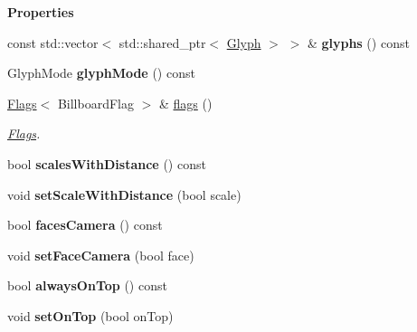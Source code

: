 \begin{Indent}\textbf{ Properties}\par
\begin{DoxyCompactItemize}
\item 
\mbox{\label{classrev_1_1_canvas_component_a3d3c700a258d2e3571b28fca33c7b177}} 
const std\+::vector$<$ std\+::shared\+\_\+ptr$<$ \mbox{\hyperlink{classrev_1_1_glyph}{Glyph}} $>$ $>$ \& {\bfseries glyphs} () const
\item 
\mbox{\label{classrev_1_1_canvas_component_a71690bbf5d7a7fa2faaecf50ccb13199}} 
Glyph\+Mode {\bfseries glyph\+Mode} () const
\item 
\mbox{\label{classrev_1_1_canvas_component_ab996e413ed00a8c4713e377939e24398}} 
\mbox{\hyperlink{classrev_1_1_flags}{Flags}}$<$ Billboard\+Flag $>$ \& \mbox{\hyperlink{classrev_1_1_canvas_component_ab996e413ed00a8c4713e377939e24398}{flags}} ()
\begin{DoxyCompactList}\small\item\em \mbox{\hyperlink{classrev_1_1_flags}{Flags}}. \end{DoxyCompactList}\item 
\mbox{\label{classrev_1_1_canvas_component_a8553ace0a3fc9cbeb33e843974c344f2}} 
bool {\bfseries scales\+With\+Distance} () const
\item 
\mbox{\label{classrev_1_1_canvas_component_a2c140715960c0cc4c33bccc1efa09ae5}} 
void {\bfseries set\+Scale\+With\+Distance} (bool scale)
\item 
\mbox{\label{classrev_1_1_canvas_component_a27e40092dbd9c39ca699d7f0cd6dcd1a}} 
bool {\bfseries faces\+Camera} () const
\item 
\mbox{\label{classrev_1_1_canvas_component_a1ed99111b6deee5caa1317ac148accae}} 
void {\bfseries set\+Face\+Camera} (bool face)
\item 
\mbox{\label{classrev_1_1_canvas_component_a1f08760f900fa58ea435d870fa66f676}} 
bool {\bfseries always\+On\+Top} () const
\item 
\mbox{\label{classrev_1_1_canvas_component_ae64b52e5d3212e7fcbdd3c63a977dff0}} 
void {\bfseries set\+On\+Top} (bool on\+Top)
\end{DoxyCompactItemize}
\end{Indent}
